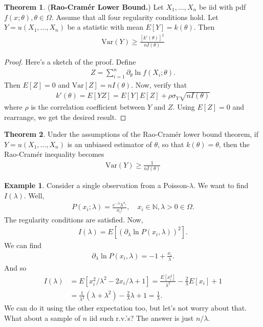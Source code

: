 \documentclass{book}
\theoremstyle{definition}
\newtheorem{thm}{Theorem}[section]
\newtheorem{exmp}{Example}[section]
\newcommand{\p}{\partial}
\newcommand{\nn}{\nonumber}
\newcommand{\f}[2]{\frac{#1}{#2}}
\newcommand{\lp}{\left(}
\newcommand{\rp}{\right)}
\newcommand{\lb}{\left[}
\newcommand{\rb}{\right]}
\begin{document}
\begin{thm}
	(\textbf{Rao-Cram\'er Lower Bound.}) Let $X_1,\dots, X_n$ be iid with pdf $f(x;\theta), \theta \in \Omega$. Assume that all four regularity conditions hold. Let $Y = u(X_1,\dots,X_n)$ be a statistic with mean $E[Y] = k(\theta)$. Then
	\begin{align}
	\text{Var}(Y) \geq \f{[k'(\theta)]^2}{nI(\theta)}
	\end{align}
\end{thm}

\begin{proof}
	Here's a sketch of the proof. Define 
	\begin{align}
	Z = \sum^n_{i=1} \p_\theta \ln f(X_i;\theta).
	\end{align}
	Then $E[Z] = 0$ and $\text{Var}[Z] = nI(\theta)$. Now, verify that
	\begin{align}
	k'(\theta) = E[YZ] = E[Y]E[Z] + \rho \sigma_Y \sqrt{nI(\theta)}
	\end{align} 
	where $\rho$ is the correlation coefficient between $Y$ and $Z$. Using $E[Z] = 0$ and rearrange, we get the desired result. 
\end{proof}



\begin{thm}
	Under the assumptions of the Rao-Cram\'er lower bound theorem, if $Y = u(X_1,\dots,X_n)$ is an unbiased estimator of $\theta$, so that $k(\theta) = \theta$, then the Rao-Cram\'er inequality becomes 
	\begin{align}
	\text{Var}(Y) \geq \f{1}{nI(\theta)}
	\end{align}
\end{thm}


\begin{exmp}
	Consider a single observation from a Poisson-$\lambda$. We want to find $I(\lambda)$. Well, 
	\begin{align}
	P(x_i;\lambda) = \f{e^{-\lambda} \lambda^{x_i}}{x_i!}, \quad x_i \in \mathbb{N}, \lambda > 0 \in \Omega.
	\end{align}
	The regularity conditions are satisfied. Now,
	\begin{align}
	I(\lambda) = E\lb \lp \p_\lambda \ln  P(x_i,\lambda)\rp^2 \rb.
	\end{align}
	We can find
	\begin{align}
	\p_\lambda \ln  P(x_i,\lambda) = -1 + \f{x_i}{\lambda}.
	\end{align}
	And so
	\begin{align}
	I(\lambda) &= E\lb x_i^2/\lambda^2 - 2x_i/\lambda + 1  \rb = \f{E[x_i^2]}{\lambda^2} - \f{2}{\lambda}E[x_i] + 1\nn\\
	&= \f{1}{\lambda^2}(\lambda + \lambda^2) - \f{2}{\lambda}\lambda + 1= \f{1}{\lambda}.
	\end{align}
	We can do it using the other expectation too, but let's not worry about that. What about a sample of $n$ iid such r.v.'s? The answer is just $n/\lambda$. 
\end{exmp}
\end{document}
